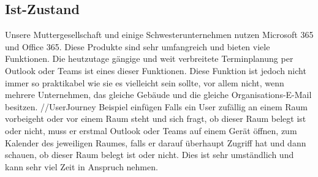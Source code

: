 


\pagebreak
\subsection{Ist-Zustand}\label{sec:ist-zustand}
Unsere Muttergesellschaft und einige Schwesterunternehmen nutzen Microsoft 365 und Office 365.
Diese Produkte sind sehr umfangreich und bieten viele Funktionen.
Die heutzutage gängige und weit verbreitete Terminplanung per Outlook oder Teams ist eines dieser Funktionen.
Diese Funktion ist jedoch nicht immer so praktikabel wie sie es vielleicht sein sollte, vor allem nicht, wenn mehrere Unternehmen, das gleiche Gebäude und die gleiche Organisations-E-Mail besitzen.
\newline
//UserJourney Beispiel einfügen
\newline
Falls ein User zufällig an einem Raum vorbeigeht oder vor einem Raum steht und sich fragt, ob dieser Raum belegt ist oder nicht, muss er erstmal Outlook oder Teams auf einem Gerät öffnen, zum Kalender des jeweiligen Raumes, falls er darauf überhaupt Zugriff hat und dann schauen, ob dieser Raum belegt ist oder nicht.
Dies ist sehr umständlich und kann sehr viel Zeit in Anspruch nehmen.

